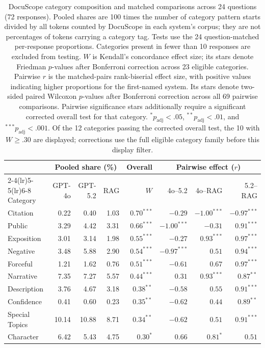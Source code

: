 \begin{table}[tbp]
\centering
\caption{DocuScope category composition and matched comparisons across 24 questions (72 responses). Pooled shares are 100 times the number of category pattern starts divided by all tokens counted by DocuScope in each system's corpus; they are not percentages of tokens carrying a category tag. Tests use the 24 question-matched per-response proportions. Categories present in fewer than 10 responses are excluded from testing. $W$ is Kendall's concordance effect size; its stars denote Friedman $p$-values after Bonferroni correction across 23 eligible categories. Pairwise $r$ is the matched-pairs rank-biserial effect size, with positive values indicating higher proportions for the first-named system. Its stars denote two-sided paired Wilcoxon $p$-values after Bonferroni correction across all 69 pairwise comparisons. Pairwise significance stars additionally require a significant corrected overall test for that category. $^{*}p_{\mathrm{adj}}<.05$, $^{**}p_{\mathrm{adj}}<.01$, and $^{***}p_{\mathrm{adj}}<.001$. Of the 12 categories passing the corrected overall test, the 10 with $W\geq .30$ are displayed; corrections use the full eligible category family before this display filter.}
\label{tab:docuscope}
\small
\setlength{\tabcolsep}{4pt}
\begin{tabular}{lrrrrrrr}
\toprule
 & \multicolumn{3}{c}{Pooled share (\%)} & \multicolumn{1}{c}{Overall} & \multicolumn{3}{c}{Pairwise effect ($r$)} \\
\cmidrule(lr){2-4}\cmidrule(lr){5-5}\cmidrule(lr){6-8}
Category & GPT-4o & GPT-5.2 & RAG & $W$ & 4o--5.2 & 4o--RAG & 5.2--RAG \\
\midrule
Citation & 0.22 & 0.40 & 1.03 & $0.70^{***}$ & $-0.29$ & $-1.00^{***}$ & $-0.97^{***}$ \\
Public & 3.29 & 4.42 & 3.31 & $0.66^{***}$ & $-1.00^{***}$ & $-0.31$ & $0.91^{***}$ \\
Exposition & 3.01 & 3.14 & 1.98 & $0.55^{***}$ & $-0.27$ & $0.93^{***}$ & $0.97^{***}$ \\
Negative & 3.48 & 5.88 & 2.90 & $0.54^{***}$ & $-0.97^{***}$ & $0.51$ & $0.94^{***}$ \\
Forceful & 1.21 & 1.62 & 0.76 & $0.51^{***}$ & $-0.61$ & $0.67$ & $0.97^{***}$ \\
Narrative & 7.35 & 7.27 & 5.57 & $0.44^{***}$ & $0.31$ & $0.93^{***}$ & $0.87^{**}$ \\
Description & 3.76 & 4.67 & 3.18 & $0.38^{**}$ & $-0.58$ & $0.55$ & $0.91^{***}$ \\
Confidence & 0.41 & 0.60 & 0.23 & $0.35^{**}$ & $-0.62$ & $0.44$ & $0.89^{**}$ \\
Special Topics & 10.14 & 10.88 & 8.71 & $0.34^{**}$ & $-0.62$ & $0.51$ & $0.91^{***}$ \\
Character & 6.42 & 5.43 & 4.75 & $0.30^{*}$ & $0.66$ & $0.81^{*}$ & $0.51$ \\
\bottomrule
\end{tabular}
\end{table}
